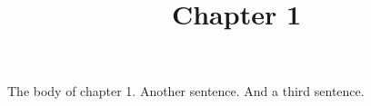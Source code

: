 \documentclass{article}
\begin{document}
\title{Chapter 1}

\maketitle


The body of chapter 1. Another sentence. And a third sentence.
\end{document}

